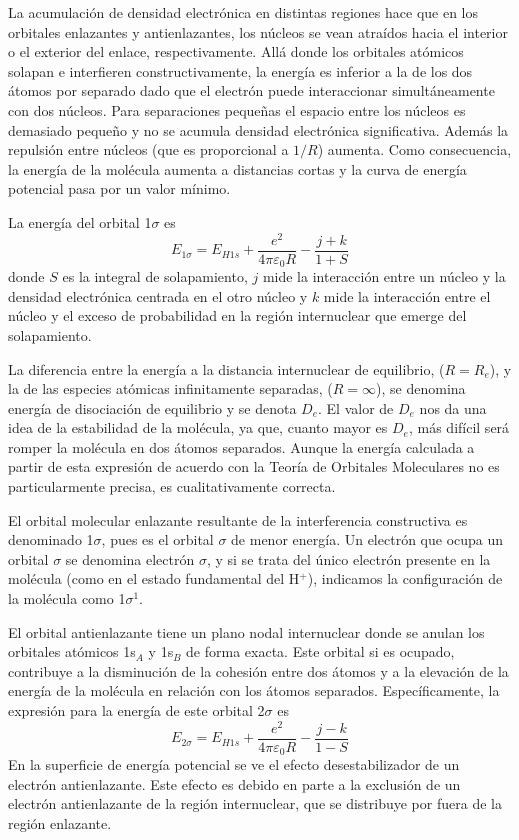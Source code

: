 La acumulación de densidad electrónica en distintas regiones 
hace que en los orbitales enlazantes y antienlazantes, los 
núcleos se vean atraídos hacia el interior o el exterior del
enlace, respectivamente. Allá donde los orbitales atómicos
solapan e interfieren constructivamente, la energía es inferior
a la de los dos átomos por separado dado que el electrón
puede interaccionar simultáneamente con dos núcleos.
Para separaciones pequeñas el
espacio  entre los núcleos es demasiado pequeño y no se 
acumula densidad electrónica significativa. Además la 
repulsión entre núcleos (que es proporcional a $1/R$) aumenta.
Como consecuencia, la energía de la molécula aumenta a 
distancias cortas y la curva de energía potencial pasa por 
un valor mínimo. 

La energía del orbital 1$\sigma$ es 
\begin{equation}
    E_{1\sigma}=E_{H1s} + \frac{e^2}{4\pi\varepsilon_0R}
    -\frac{j+k}{1+S}
\end{equation}
donde $S$ es la integral de solapamiento, $j$ mide
la interacción entre un núcleo y la densidad 
electrónica centrada en el otro núcleo y $k$
mide la interacción entre el núcleo y el exceso
de probabilidad en la región internuclear
que emerge del solapamiento. 

La diferencia entre la energía a la distancia
internuclear de equilibrio, ($R = R_e$), y la 
de las especies atómicas infinitamente separadas,
($R=\infty$), se denomina energía de disociación
de equilibrio y se denota $D_e$. El valor de $D_e$
nos da una idea de la estabilidad de la molécula, 
ya que, cuanto mayor es $D_e$, más difícil será 
romper la molécula en dos átomos separados. Aunque 
la energía calculada a partir de esta expresión de
acuerdo con la Teoría de Orbitales Moleculares no 
es particularmente precisa, es cualitativamente 
correcta.

El orbital molecular enlazante resultante de la 
interferencia constructiva es denominado 1$\sigma$,
pues es el orbital $\sigma$ de menor energía. Un 
electrón que ocupa un orbital $\sigma$ se denomina 
electrón $\sigma$, y si se trata del único electrón 
presente en la molécula (como en el estado fundamental
del H$^+$), indicamos la configuración de la molécula 
como 1$\sigma^1$. 

El orbital antienlazante tiene un plano nodal 
internuclear donde se anulan los orbitales atómicos
1s$_A$ y 1s$_B$ de forma exacta. Este orbital si 
es ocupado, contribuye a la disminución de la 
cohesión entre dos átomos y a la elevación de 
la energía de la molécula en relación con los 
átomos separados. Específicamente, la expresión para
la energía de este orbital 2$\sigma$ es
\begin{equation}
    E_{2\sigma}=E_{H1s} + \frac{e^2}{4\pi\varepsilon_0R}
    -\frac{j-k}{1-S}
\end{equation}
En la superficie de energía potencial se ve el efecto
desestabilizador de un electrón antienlazante. Este efecto
es debido en parte a la exclusión de un electrón 
antienlazante de la región internuclear, que se
distribuye por fuera de la región enlazante. 

